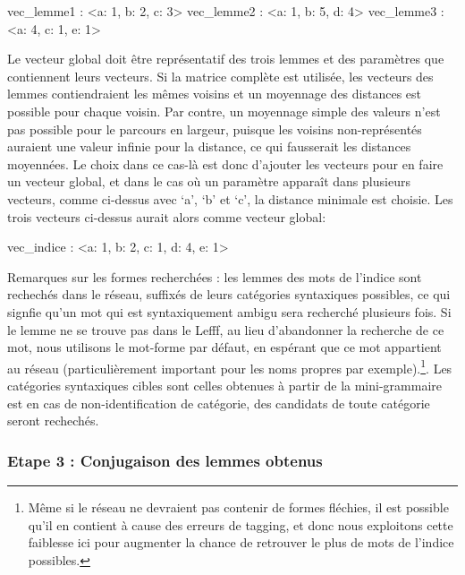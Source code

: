 \begin{framed}
vec\_lemme1 : \textless{a: 1, b: 2, c: 3}\textgreater \newline
vec\_lemme2 : \textless{a: 1, b: 5, d: 4}\textgreater \newline
vec\_lemme3 : \textless{a: 4, c: 1, e: 1}\textgreater 
\end{framed}

Le vecteur global doit être représentatif des trois lemmes et des paramètres que contiennent leurs vecteurs. Si la matrice complète est utilisée, les vecteurs des lemmes contiendraient les mêmes voisins et un moyennage des distances est possible pour chaque voisin. Par contre, un moyennage simple des valeurs n'est pas possible pour le parcours en largeur, puisque les voisins non-représentés auraient une valeur infinie pour la distance, ce qui fausserait les distances moyennées. Le choix dans ce cas-là est donc d'ajouter les vecteurs pour en faire un vecteur global, et dans le cas où un paramètre apparaît dans plusieurs vecteurs, comme ci-dessus avec \lq{a}\rq{}, \lq{b}\rq{} et \lq{c}\rq{}, la distance minimale est choisie. Les trois vecteurs ci-dessus aurait alors comme vecteur global:

\begin{framed}
vec\_indice : \textless{a: 1, b: 2, c: 1, d: 4, e: 1}\textgreater 
\end{framed}

Remarques sur les formes recherchées : les lemmes des mots de l'indice sont rechechés dans le réseau, suffixés de leurs catégories syntaxiques possibles, ce qui signfie qu'un mot qui est syntaxiquement ambigu sera recherché plusieurs fois. Si le lemme ne se trouve pas dans le Lefff, au lieu d'abandonner la recherche de ce mot, nous utilisons le mot-forme par défaut, en espérant que ce mot appartient au réseau (particulièrement important pour les noms propres par exemple).\footnote{Même si le réseau ne devraient pas contenir de formes fléchies, il est possible qu'il en contient à cause des erreurs de tagging, et donc nous exploitons cette faiblesse ici pour augmenter la chance de retrouver le plus de mots de l'indice possibles.}. Les catégories syntaxiques cibles sont celles obtenues à partir de la mini-grammaire est en cas de non-identification de catégorie, des candidats de toute catégorie seront rechechés.

\subsubsection{Etape 3 : Conjugaison des lemmes obtenus}

